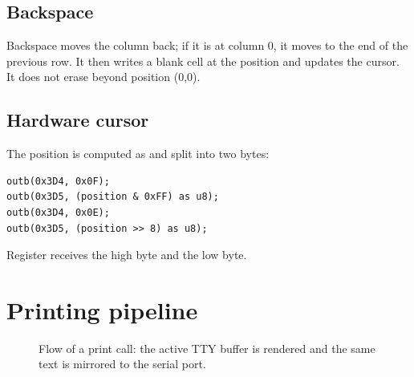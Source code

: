 \subsection{Backspace}

Backspace moves the column back; if it is at column 0, it moves to the end of the
previous row. It then writes a blank cell at the position and updates
the cursor. It does not erase beyond position (0,0).

\subsection{Hardware cursor}

The position is computed as  and split into two
bytes:

\begin{lstlisting}[caption={Cursor update via CRTC.},label={lst:cursor}]
outb(0x3D4, 0x0F);
outb(0x3D5, (position & 0xFF) as u8);
outb(0x3D4, 0x0E);
outb(0x3D5, (position >> 8) as u8);
\end{lstlisting}

Register  receives the high byte and  the low byte.

\section{Printing pipeline}

\begin{figure}[H]
\centering
{}
\caption{Flow of a print call: the active TTY buffer is rendered and the
same text is mirrored to the serial port.}
\label{fig:printpipeline}
\end{figure}

